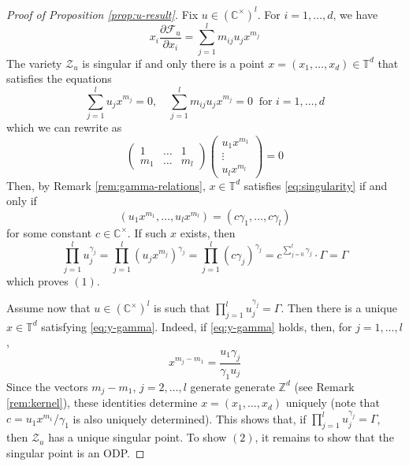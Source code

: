 \documentclass[11pt, reqno]{amsart}
\theoremstyle{plain}
\theoremstyle{definition}
\newcommand{\CC}{\mathbb{C}}
\newcommand{\ZZ}{\mathbb{Z}}
\newcommand{\TT}{\mathbb{T}}
\begin{document}
\begin{proof}[Proof of Proposition \ref{prop:u-result}] 
Fix $u \in (\CC^\times)^l$.
For $i=1, \dots, d$, we have
\begin{equation}
 x_i \frac{\partial  \mathcal{F}_u }{\partial x_i} = \sum_{j=1}^l m_{ij} u_j x^{m_j}
\end{equation}
The variety $\mathcal{Z}_u$ is singular if and only there is a point  $x=(x_1, \dots, x_d) \in \TT^d$ that satisfies the equations
\begin{equation}
\label{eq:singularity}
\sum_{j=1}^l u_j x^{m_j}=0,  \quad 
  \sum_{j=1}^l m_{ij}  u_j x^{m_{j}}=0 \ \text{ for } i =1,\dots,d 
\end{equation} 
which we can rewrite as
\begin{equation*}
\label{eq:1m-system}
\begin{pmatrix}
1 & \dots & 1\\
m_1 & \dots & m_l
\end{pmatrix} \begin{pmatrix}
u_1 x^{m_1}\\
\vdots\\
u_l x^{m_l}
\end{pmatrix} = 0
\end{equation*}
Then, by Remark \ref{rem:gamma-relations}, $x \in \TT^d$ satisfies \eqref{eq:singularity} if and only if 
    \begin{equation}
    \label{eq:y-gamma}
    (u_1 x^{m_1}, \dots, u_l x^{m_l}) =(c \gamma_1,  \dots, c \gamma_l)\end{equation} for some constant $c \in \CC^\times$. 
If such $x$ exists, then 
\[
\prod_{j=1}^l u_j^{\gamma_j}= \prod_{j=1}^l \left( u_j x^{m_j} \right)^{\gamma_j}= \prod_{j=1}^l\left(  c\gamma_j\right)^{\gamma_j}= c^{\sum_{j=0}^l \gamma_j} \cdot \Gamma=\Gamma
\]
which proves $(1)$. 

Assume now that $u \in (\CC^\times)^l$ is such that $\prod_{j=1}^l u_j^{\gamma_j}=\Gamma$. 
Then there is a unique $x \in \TT^d$ satisfying \eqref{eq:y-gamma}. 
Indeed, if \eqref{eq:y-gamma} holds, then, for $j=1, \dots, l$, 
\[ x^{m_j-m_1}=\frac{u_1 \gamma_j}{\gamma_1 u_j}
\]
Since the vectors $m_j-m_1$, $j=2, \dots, l$ generate generate $\ZZ^d$ (see Remark \ref{rem:kernel}), these identities determine $x=(x_1, \dots, x_d)$ uniquely (note that $c=u_1x^{m_1}/\gamma_1$ is also uniquely determined).
This shows that, if $\prod_{j=1}^l u_j^{\gamma_j}=\Gamma$, then $\mathcal{Z}_u$ has a unique singular point. To show $(2)$, it remains to show that the singular point is an ODP. 


\end{proof}
\end{document}
